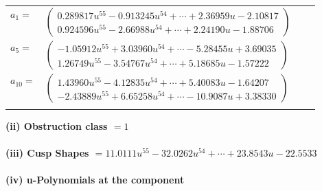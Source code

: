 \documentclass[1p]{elsarticle_modified}
\theoremstyle{definition}
\begin{document}
\begin{tabular}{m{7pt} m{180pt} m{7pt} m{180pt} }
\flushright $a_{1}=$&$\begin{pmatrix}0.289817 u^{55}-0.913245 u^{54}+\cdots+2.36959 u-2.10817\\0.924596 u^{55}-2.66988 u^{54}+\cdots+2.24190 u-1.88706\end{pmatrix}$ \\
\flushright $a_{5}=$&$\begin{pmatrix}-1.05912 u^{55}+3.03960 u^{54}+\cdots-5.28455 u+3.69035\\1.26749 u^{55}-3.54767 u^{54}+\cdots+5.18685 u-1.57222\end{pmatrix}$ \\
\flushright $a_{10}=$&$\begin{pmatrix}1.43960 u^{55}-4.12835 u^{54}+\cdots+5.40083 u-1.64207\\-2.43889 u^{55}+6.65258 u^{54}+\cdots-10.9087 u+3.38330\end{pmatrix}$\\&\end{tabular}
\flushleft \textbf{(ii) Obstruction class $= 1$}\\~\\
\flushleft \textbf{(iii) Cusp Shapes $= 11.0111 u^{55}-32.0262 u^{54}+\cdots+23.8543 u-22.5533$}\\~\\
\newpage\renewcommand{\arraystretch}{1}
\flushleft \textbf{(iv) u-Polynomials at the component}\newline \\
\end{document}
